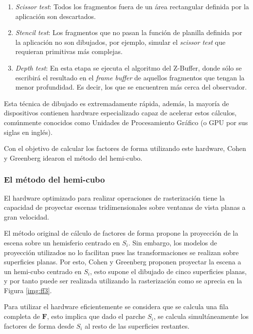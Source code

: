 \begin{enumerate}
\begin{enumerate}
			\item \textit{Scissor test}: Todos los fragmentos fuera de un área rectangular definida por la aplicación son descartados.
			\item \textit{Stencil test}: Los fragmentos que no pasan la función de planilla definida por la aplicación no son dibujados, por ejemplo, simular el \textit{scissor test} que requieran primitivas más complejas.
			\item \textit{Depth test}: En esta etapa se ejecuta el algoritmo del Z-Buffer, donde sólo se escribirá el resultado en el \textit{frame buffer} de aquellos fragmentos que tengan la menor profundidad. Es decir, los que se encuentren más cerca del observador.
		\end{enumerate}
\end{enumerate}

Esta técnica de dibujado es extremadamente rápida, además, la mayoría de dispositivos contienen hardware especializado capaz de acelerar estos cálculos, comúnmente conocidos como Unidades de Procesamiento Gráfico (o GPU por sus siglas en inglés).

Con el objetivo de calcular los factores de forma utilizando este hardware, Cohen y Greenberg \cite{Cohen} idearon el método del hemi-cubo.

\subsubsection{El método del hemi-cubo}

El hardware optimizado para realizar operaciones de rasterización tiene la capacidad de proyectar escenas tridimensionales sobre ventanas de vista planas a gran velocidad. 

El método original de cálculo de factores de forma propone la proyección de la escena sobre un hemisferio centrado en $S_{i}$. Sin embargo, los modelos de proyección utilizados no lo facilitan pues las transformaciones se realizan sobre superficies planas. Por esto, Cohen y Greenberg \cite{Cohen} proponen proyectar la escena a un hemi-cubo centrado en $S_{i}$, esto supone el dibujado de cinco superficies planas, y por tanto puede ser realizada utilizando la rasterización como se aprecia en la Figura \ref{img:ff3}.

Para utilizar el hardware eficientemente se considera que se calcula una fila completa de $\mathbf{F}$, esto implica que dado el parche $S_{i}$, se calcula simultáneamente los factores de forma desde $S_{i}$ al resto de las superficies restantes. 


